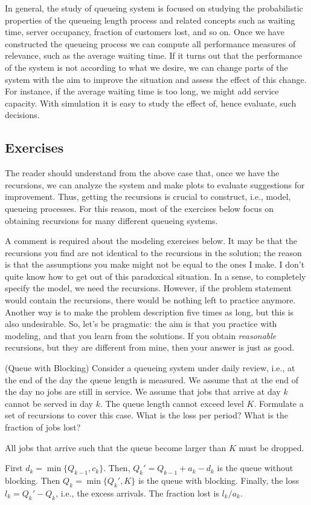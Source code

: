 In general, the study of queueing system is focused on
studying the probabilistic properties of the queueing length process
and related concepts such as waiting time, server occupancy, fraction
of customers lost, and so on. Once we have constructed the queueing
process we can compute all performance measures of relevance, such as
the average waiting time. If it turns out that the
performance of the system is not according to what we desire, we can
change parts of the system with the aim to improve the situation and
assess the effect of this change.  For instance, if the average
waiting time is too long, we might add service capacity. With simulation it is easy to study the effect of, hence
evaluate, such decisions.

\subsection*{Exercises}
\label{sec:exercises-1}


The reader should understand from the above case that, once we have
the recursions, we can analyze the system and make plots to evaluate
suggestions for improvement.  Thus, getting the recursions is crucial
to construct, i.e., model, queueing processes. For this reason, most
of the exercises below focus on obtaining recursions for many
different queueing systems. 

A comment is required about the modeling exercises below. It may be
that the recursions you find are not identical to the recursions in
the solution; the reason is that the assumptions you make might not be
equal to the ones I make. I don't quite know how to get out of this
paradoxical situation.  In a sense, to completely specify the model,
we need the recursions. However, if the problem statement would
contain the recursions, there would be nothing left to practice
anymore. Another way is to make the problem description five times as
long, but this is also undesirable. So, let's be pragmatic: the aim is
that you practice with modeling, and that you learn from the
solutions.  If you obtain \emph{reasonable} recursions, but they are
different from mine, then your answer is just as good.

\begin{exercise} (Queue with Blocking) Consider a queueing system
  under daily review, i.e., at the end of the day the queue length is
  measured. We assume that at the end of the day no jobs are still in
  service. We assume that jobs that arrive at day $k$ cannot be served
  in day $k$. The queue length cannot exceed level $K$.  Formulate a
  set of recursions to cover this case. What is the loss per period? What is the fraction of jobs lost?
  \begin{solution}

    All jobs that arrive such that the queue become larger than $K$
    must be dropped. 

First $d_k = \min\{Q_{k-1}, c_k\}$. Then, $Q_k' = Q_{k-1}+a_k-d_k$ is the queue without blocking. Then $Q_k=\min\{Q_k', K\}$ is the queue with blocking. Finally, the loss $l_k=Q_k'-Q_k$, i.e., the excess arrivals. The fraction lost is $l_k/a_k$. 
  \end{solution}
\end{exercise}

